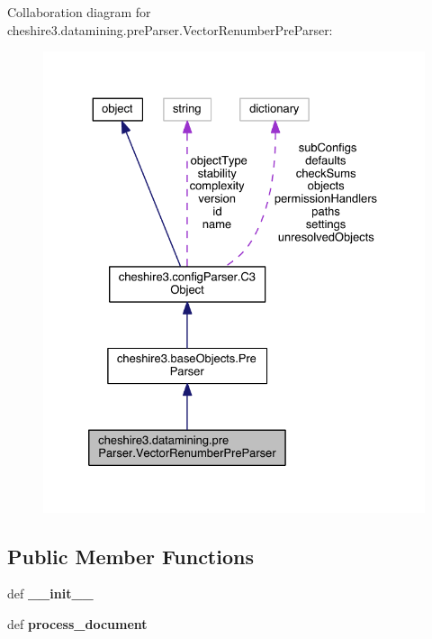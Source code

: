 Collaboration diagram for cheshire3.\-datamining.\-pre\-Parser.\-Vector\-Renumber\-Pre\-Parser\-:
\nopagebreak
\begin{figure}[H]
\begin{center}
\leavevmode
\includegraphics[width=328pt]{classcheshire3_1_1datamining_1_1pre_parser_1_1_vector_renumber_pre_parser__coll__graph}
\end{center}
\end{figure}
\subsection*{Public Member Functions}
\begin{DoxyCompactItemize}
\item 
\hypertarget{classcheshire3_1_1datamining_1_1pre_parser_1_1_vector_renumber_pre_parser_ad3a01ac115bee3637a73431f5806ae83}{def {\bfseries \-\_\-\-\_\-init\-\_\-\-\_\-}}\label{classcheshire3_1_1datamining_1_1pre_parser_1_1_vector_renumber_pre_parser_ad3a01ac115bee3637a73431f5806ae83}

\item 
\hypertarget{classcheshire3_1_1datamining_1_1pre_parser_1_1_vector_renumber_pre_parser_a663816194af6ec466882a1eb10bf6c22}{def {\bfseries process\-\_\-document}}\label{classcheshire3_1_1datamining_1_1pre_parser_1_1_vector_renumber_pre_parser_a663816194af6ec466882a1eb10bf6c22}

\end{DoxyCompactItemize}
